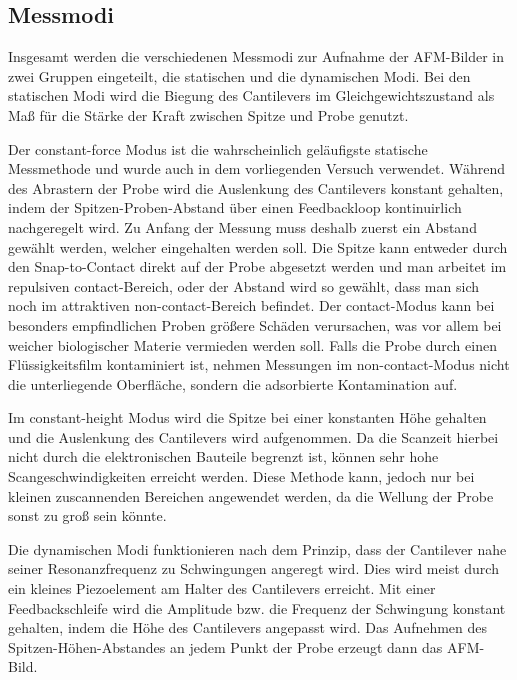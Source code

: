 \subsection{Messmodi}
\label{sec:messmodi}
    Insgesamt werden die verschiedenen Messmodi zur Aufnahme der AFM-Bilder in zwei Gruppen eingeteilt, die statischen und die dynamischen Modi.
    Bei den statischen Modi wird die Biegung des Cantilevers im Gleichgewichtszustand als Maß für die Stärke der Kraft zwischen Spitze und Probe genutzt.

    Der constant-force Modus ist die wahrscheinlich geläufigste statische Messmethode und wurde auch in dem vorliegenden Versuch verwendet.
    Während des Abrastern der Probe wird die Auslenkung des Cantilevers konstant gehalten, indem der Spitzen-Proben-Abstand über einen Feedbackloop kontinuirlich nachgeregelt wird.
    Zu Anfang der Messung muss deshalb zuerst ein Abstand gewählt werden, welcher eingehalten werden soll.
    Die Spitze kann entweder durch den Snap-to-Contact direkt auf der Probe abgesetzt werden und man arbeitet im repulsiven contact-Bereich, oder der Abstand wird so gewählt, dass man sich noch im attraktiven non-contact-Bereich befindet.
    Der contact-Modus kann bei besonders empfindlichen Proben größere Schäden verursachen, was vor allem bei weicher biologischer Materie vermieden werden soll.
    Falls die Probe durch einen Flüssigkeitsfilm kontaminiert ist, nehmen Messungen im non-contact-Modus nicht die unterliegende Oberfläche, sondern die adsorbierte Kontamination auf.

    Im constant-height Modus wird die Spitze bei einer konstanten Höhe gehalten und die Auslenkung des Cantilevers wird aufgenommen.
    Da die Scanzeit hierbei nicht durch die elektronischen Bauteile begrenzt ist, können sehr hohe Scangeschwindigkeiten erreicht werden.
    Diese Methode kann, jedoch nur bei kleinen zuscannenden Bereichen angewendet werden, da die Wellung der Probe sonst zu groß sein könnte.

    Die dynamischen Modi funktionieren nach dem Prinzip, dass der Cantilever nahe seiner Resonanzfrequenz zu Schwingungen angeregt wird.
    Dies wird meist durch ein kleines Piezoelement am Halter des Cantilevers erreicht.
    Mit einer Feedbackschleife wird die Amplitude bzw. die Frequenz der Schwingung konstant gehalten, indem die Höhe des Cantilevers angepasst wird.
    Das Aufnehmen des Spitzen-Höhen-Abstandes an jedem Punkt der Probe erzeugt dann das AFM-Bild.

